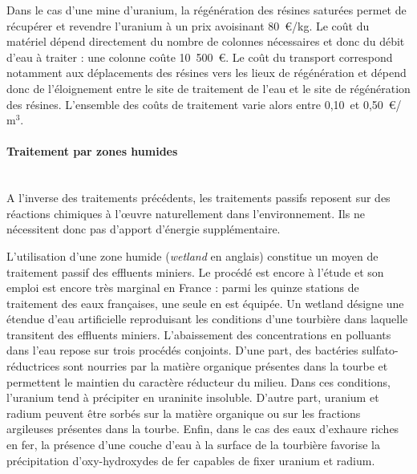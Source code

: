 \documentclass{article}
\begin{document}


Dans le cas d’une mine d’uranium, la régénération des résines saturées permet de récupérer et revendre l’uranium à un prix avoisinant 80~\euro{}/kg. Le coût du matériel dépend directement du nombre de colonnes nécessaires et donc du débit d’eau à traiter : une colonne coûte 10~500~\euro{}. Le coût du transport correspond notamment aux déplacements des résines vers les lieux de régénération et dépend donc de l’éloignement entre le site de traitement de l’eau et le site de régénération des résines. L’ensemble des coûts de traitement varie alors entre 0,10~et 0,50~\euro{}/$\text{m}^3$.

\paragraph{Traitement par zones humides \\ \\}

A l’inverse des traitements précédents, les traitements passifs reposent sur des réactions chimiques à l’œuvre naturellement dans l’environnement. Ils ne nécessitent donc pas d’apport d’énergie supplémentaire. 

L’utilisation d’une zone humide (\textit{wetland} en anglais) constitue un moyen de traitement passif des effluents miniers. Le procédé est encore à l’étude et son emploi est encore très marginal en France : parmi les quinze stations de traitement des eaux françaises, une seule en est équipée. Un wetland désigne une étendue d’eau artificielle reproduisant les conditions d’une tourbière dans laquelle transitent des effluents miniers. L’abaissement des concentrations en polluants dans l’eau repose sur trois procédés conjoints. D’une part, des bactéries sulfato-réductrices sont nourries par la matière organique présentes dans la tourbe et permettent le maintien du caractère réducteur du milieu. Dans ces conditions, l’uranium tend à précipiter en uraninite insoluble. D’autre part, uranium et radium peuvent être sorbés sur la matière organique ou sur les fractions argileuses présentes dans la tourbe. Enfin, dans le cas des eaux d’exhaure riches en fer, la présence d’une couche d’eau à la surface de la tourbière favorise la précipitation d’oxy-hydroxydes de fer capables de fixer uranium et radium. 
\end{document}
